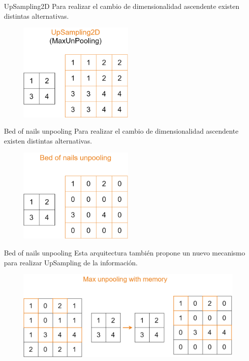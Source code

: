 \begin{frame}{UpSampling2D}
Para realizar el \alert{cambio de dimensionalidad} ascendente existen distintas alternativas.

\begin{figure}
    \centering
    \includegraphics[width=0.5\textwidth]{Slides/figures/Tema 4/UpSampling2D.png}
\end{figure}
\end{frame}

\begin{frame}{Bed of nails unpooling}
Para realizar el \alert{cambio de dimensionalidad} ascendente existen distintas alternativas.

\begin{figure}
    \centering
    \includegraphics[width=0.5\textwidth]{Slides/figures/Tema 4/BedOfNails.png}
\end{figure}
\end{frame}

\begin{frame}{Bed of nails unpooling}
Esta arquitectura también propone un nuevo mecanismo para realizar \alert{UpSampling} de la información.

\begin{figure}
    \centering
    \includegraphics[width=\textwidth]{Slides/figures/Tema 4/MaxWithMemory.png}
\end{figure}
\end{frame}

